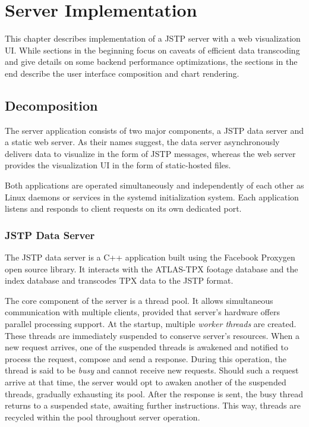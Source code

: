 \chapter{Server Implementation}
This chapter describes implementation of a JSTP server with a web visualization UI. While sections in the beginning focus on caveats of efficient data transcoding and give details on some backend performance optimizations, the sections in the end describe the user interface composition and chart rendering.

\section{Decomposition}
The server application consists of two major components, a JSTP data server and a static web server. As their names suggest, the data server asynchronously delivers data to visualize in the form of JSTP messages, whereas the web server provides the visualization UI in the form of static-hosted files.

Both applications are operated simultaneously and independently of each other as Linux daemons or services in the systemd initialization system. Each application listens and responds to client requests on its own dedicated port.

\subsection{JSTP Data Server}
The JSTP data server is a C++ application built using the Facebook Proxygen open source library. It interacts with the ATLAS-TPX footage database and the index database and transcodes TPX data to the JSTP format.

The core component of the server is a thread pool. It allows simultaneous communication with multiple clients, provided that server's hardware offers parallel processing support. At the startup, multiple \textit{worker threads} are created. These threads are immediately suspended to conserve server's resources. When a new request arrives, one of the suspended threads is awakened and notified to process the request, compose and send a response. During this operation, the thread is said to be \textit{busy} and cannot receive new requests. Should such a request arrive at that time, the server would opt to awaken another of the suspended threads, gradually exhausting its pool. After the response is sent, the busy thread returns to a suspended state, awaiting further instructions. This way, threads are recycled within the pool throughout server operation.

